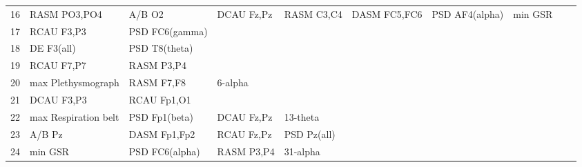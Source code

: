 \begin{landscape}
\begin{table}[]
\begin{tabular}{l|llllllll}
16       & RASM PO3,PO4          & A/B O2                & DCAU Fz,Pz           & RASM C3,C4              & DASM FC5,FC6            & PSD AF4(alpha)       & min GSR              &                       &                       &                    \\
17       & RCAU F3,P3            & PSD FC6(gamma)        &                      &                         &                         &                      &                      &                       &                       &                    \\
18       & DE F3(all)            & PSD T8(theta)         &                      &                         &                         &                      &                      &                       &                       &                    \\
19       & RCAU F7,P7            & RASM P3,P4            &                      &                         &                         &                      &                      &                       &                       &                    \\
20       & max Plethysmograph    & RASM F7,F8            & 6-alpha              &                         &                         &                      &                      &                       &                       &                    \\
21       & DCAU F3,P3            & RCAU Fp1,O1           &                      &                         &                         &                      &                      &                       &                       &                    \\
22       & max Respiration belt  & PSD Fp1(beta)         & DCAU Fz,Pz           & 13-theta                &                         &                      &                      &                       &                       &                    \\
23       & A/B Pz                & DASM Fp1,Fp2          & RCAU Fz,Pz           & PSD Pz(all)             &                         &                      &                      &                       &                       &                    \\
24       & min GSR               & PSD FC6(alpha)        & RASM P3,P4           & 31-alpha                &                         &                      &                      &                       &                       &                    \\

\end{tabular}
\end{table}
\end{landscape}
